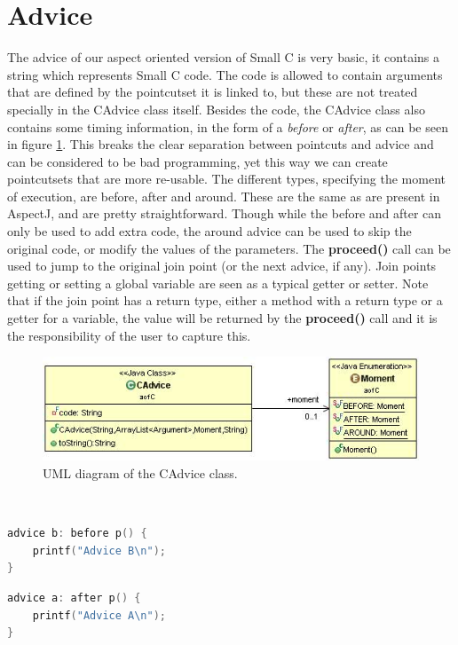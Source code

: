 \documentclass[a4paper]{report}
\begin{document}
\section{Advice}
The advice of our aspect oriented version of Small C is very basic, it contains a string which represents Small C code. The code is allowed to contain arguments that are defined by the pointcutset it is linked to, but these are not treated specially in the CAdvice class itself. Besides the code, the CAdvice class also contains some timing information, in the form of a \textit{before} or \textit{after}, as can be seen in figure \ref{fig:CAdvice}. This breaks the clear separation between pointcuts and advice and can be considered to be bad programming, yet this way we can create pointcutsets that are more re-usable. The different types, specifying the moment of execution, are before, after and around. These are the same as are present in AspectJ, and are pretty straightforward. Though while the before and after can only be used to add extra code, the around advice can be used to skip the original code, or modify the values of the parameters. The \textbf{proceed()} call can be used to jump to the original join point (or the next advice, if any). Join points getting or setting a global variable are seen as a typical getter or setter. Note that if the join point has a return type, either a method with a return type or a getter for a variable, the value will be returned by the \textbf{proceed()} call and it is the responsibility of the user to capture this.
\begin{figure}
\centering
\includegraphics[scale=0.7]{images/AOFC/CAdvice.jpg}
\caption{UML diagram of the CAdvice class.}
\label{fig:CAdvice}
\end{figure}\\
\begin{minipage}{0.42\textwidth}
\begin{lstlisting}[language=C, caption=Example of a before advice, label=lst:SmallC_BeforeAdvice]
advice b: before p() {
	printf("Advice B\n");
}
\end{lstlisting}
\begin{lstlisting}[language=C, caption=Example of an after advice, label=lst:SmallC_AfterAdvice]
advice a: after p() {
	printf("Advice A\n");
}
\end{lstlisting}
\end{minipage}\hfill
\end{document}
